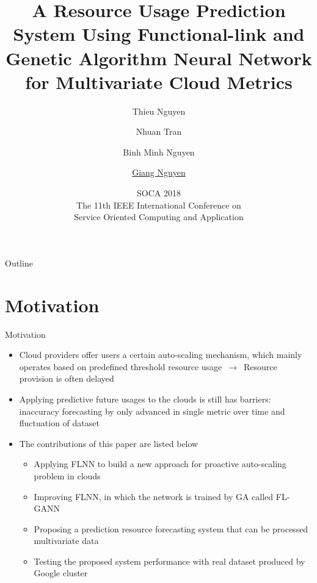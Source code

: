 \documentclass{beamer}
\title{\large A Resource Usage Prediction System Using Functional-link and Genetic Algorithm Neural Network for Multivariate Cloud Metrics}
\author{\small Thieu Nguyen \and Nhuan Tran \and Binh Minh Nguyen \\ \and \underline{Giang Nguyen}}
\institute{ Institute of Informatics\\ Slovak Academy of Sciences, Bratislava, Slovakia}
\date{SOCA 2018\\
	The 11th IEEE International Conference on\\ Service Oriented Computing and Application}
\begin{document}
\begin{frame}
  \titlepage
\end{frame}

\begin{frame}{Outline}
  \tableofcontents
\end{frame}


\section{Motivation}
\begin{frame}{Motivation}
	\begin{itemize}
		\item {Cloud providers offer users a certain auto-scaling mechanism, which mainly operates based on predefined threshold resource usage $\,\to\,$ Resource provision is often delayed
		}
		\item {Applying predictive future usages to the clouds is still has barriers: inaccuracy forecasting by only advanced in single metric over time and fluctuation of dataset}
		\item {The contributions of this paper are listed below}
		\begin{itemize}
			\item Applying FLNN to build a new approach for proactive auto-scaling problem in clouds
			\item Improving FLNN, in which the network is trained by GA called FL-GANN
			\item Proposing a prediction resource forecasting system that can be processed multivariate data
			\item Testing the proposed system performance with real dataset produced by Google cluster
			
		\end{itemize}
		
	\end{itemize}
\end{frame}
\end{document}
